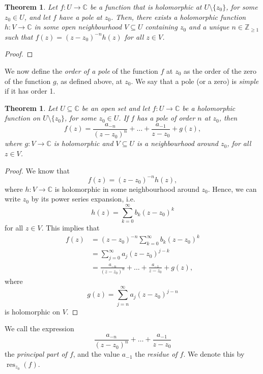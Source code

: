 \documentclass[a4paper, openany]{memoir}
\theoremstyle{definition}
\theoremstyle{plain}
\newtheorem{theorem}[definition]{Theorem}
\begin{document}
    \begin{theorem}
        Let $f \colon U \to \mathbb{C}$ be a function that is holomorphic at $U \setminus \{z_0\}$, for some $z_0 \in U$, and let $f$ have a pole at $z_0$. Then, there exists a holomorphic function $h \colon V \to \mathbb{C}$ in some open neighbourhood $V \subseteq U$ containing $z_0$ and a unique $n \in \mathbb{Z}_{\geq 1}$ such that $f(z) = (z - z_0)^{-n} h(z)$ for all $z \in V$.
    \end{theorem}
    \begin{proof}
    \end{proof}

    We now define the \emph{order of a pole} of the function $f$ at $z_0$ as the order of the zero of the function $g$, as defined above, at $z_0$. We say that a pole (or a zero) is \emph{simple} if it has order 1.

    \begin{theorem}
        Let $U \subseteq \mathbb{C}$ be an open set and let $f \colon U \to \mathbb{C}$ be a holomorphic function on $U \setminus \{z_0\}$, for some $z_0 \in U$. If $f$ has a pole of order $n$ at $z_0$, then
        \[f(z) = \frac{a_{-n}}{(z - z_0)^n} + \dots + \frac{a_{-1}}{z - z_0} + g(z),\]
        where $g \colon V \to \mathbb{C}$ is holomorphic and $V \subseteq U$ is a neighbourhood around $z_0$, for all $z \in V$.
    \end{theorem}
    \begin{proof}
        We know that
        \[f(z) = (z - z_0)^{-n} h(z),\]
        where $h \colon V \to \mathbb{C}$ is holomorphic in some neighbourhood around $z_0$. Hence, we can write $z_0$ by its power series expansion, i.e.
        \[h(z) = \sum_{k=0}^\infty b_k (z - z_0)^k\]
        for all $z \in V$. This implies that
        \begin{align*}
            f(z) &= (z - z_0)^{-n} \sum_{k=0}^\infty b_k (z - z_0)^k \\
            &= \sum_{j=0}^\infty a_j (z - z_0)^{j - k} \\
            &= \frac{a_{-n}}{(z - z_0)^n} + \dots + \frac{a_{-1}}{z - z_0} + g(z),
        \end{align*}
        where
        \[g(z) = \sum_{j=n}^\infty a_j (z - z_0)^{j-n}\]
        is holomorphic on $V$.
    \end{proof}
    \noindent We call the expression
    \[\frac{a_{-n}}{(z - z_0)^n} + \dots + \frac{a_{-1}}{z - z_0}\]
    the \emph{principal part of $f$}, and the value $a_{-1}$ the \emph{residue of $f$}. We denote this by $\operatorname{res}_{z_0}(f)$.
\end{document}
